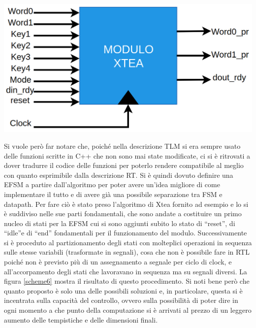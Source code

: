 \documentclass[]{IEEEtran}
\begin{document}
\begin{center}
	\includegraphics[width=\columnwidth]{Images/scheme5.png}
	\label{scheme5}
\end{center}Si vuole però far notare che, poiché nella descrizione TLM si era sempre usato delle funzioni scritte in C++ che non sono mai state modificate, ci si è ritrovati a dover tradurre il codice delle funzioni per poterlo rendere compatibile al meglio con quanto esprimibile dalla descrizione RT. Si è quindi dovuto definire una EFSM a partire dall'algoritmo per poter avere un'idea migliore di come implementare il tutto e di avere già una possibile separazione tra FSM e datapath. Per fare ciò è stato preso l'algoritmo di Xtea fornito ad esempio e lo si è suddiviso nelle sue parti fondamentali, che sono andate a costituire un primo nucleo di stati per la EFSM cui si sono aggiunti subito lo stato di ``reset'', di ``idle''e di ``end'' fondamentali per il funzionamento del modulo. Successivamente si è proceduto al partizionamento degli stati con molteplici operazioni in sequenza sulle stesse variabili (trasformate in segnali), cosa che non è possibile fare in RTL poiché non è previsto più di un assegnamento a segnale per ciclo di clock, e all'accorpamento degli stati che lavoravano in sequenza ma su segnali diversi. La figura \ref{scheme6} mostra il risultato di questo procedimento. Si noti bene però  che quanto proposto è solo una delle possibili soluzioni e, in particolare, questa si è incentrata sulla capacità del controllo, ovvero sulla possibilità di poter dire in ogni momento a che punto della computazione si è arrivati al prezzo di un leggero aumento delle tempistiche e delle dimensioni finali.
\end{document}
